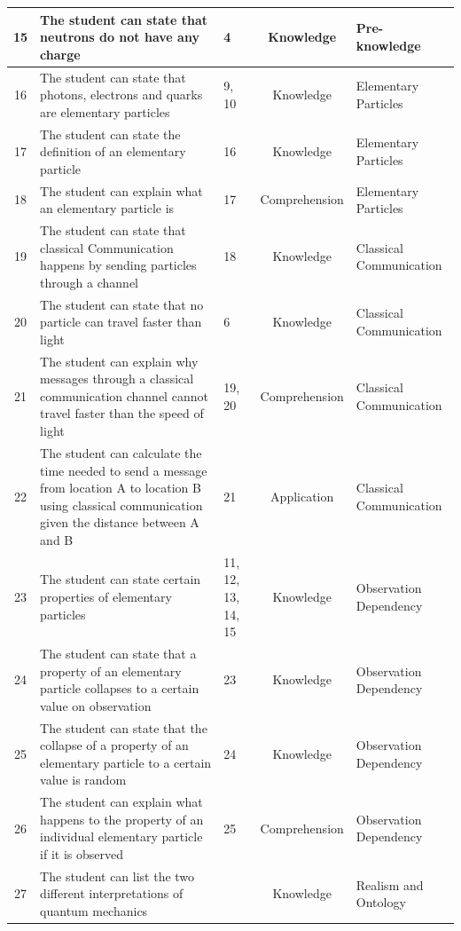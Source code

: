 \documentclass[11pt,twoside]{report} %
\begin{document}
\begin{table}[htbp]
\small
\begin{center}
\begin{tabular}{|c|p{5cm}|p{1.5cm}|c|p{3cm}|}
\hline
15 & The student can state that neutrons do not have any charge & 4 & Knowledge & Pre-knowledge \\ \hline
16 & The student can state that photons, electrons and quarks are elementary particles & 9, 10 & Knowledge & Elementary Particles \\ \hline
17 & The student can state the definition of an elementary particle & 16 & Knowledge & Elementary Particles \\ \hline
18 & The student can explain what an elementary particle is & 17 & Comprehension & Elementary Particles \\ \hline
19 & The student can state that classical Communication happens by sending particles through a channel & 18 & Knowledge & Classical Communication \\ \hline
20 & The student can state that no particle can travel faster than light & 6 & Knowledge & Classical Communication \\ \hline
21 & The student can explain why messages through a classical communication channel cannot travel faster than the speed of light & 19, 20 & Comprehension & Classical Communication \\ \hline
22 & The student can calculate the time needed to send a message from location A to location B using classical communication given the distance between A and B & 21 & Application & Classical Communication \\ \hline
23 & The student can state certain properties of elementary particles & 11, 12, 13, 14, 15 & Knowledge & Observation Dependency \\ \hline
24 & The student can state that a property of an elementary particle collapses to a certain value on observation & 23 & Knowledge & Observation Dependency \\ \hline
25 & The student can state that the collapse of a property of an elementary particle to a certain value is random & 24 & Knowledge & Observation Dependency \\ \hline
26 & The student can explain what happens to the property of an individual elementary particle if it is observed & 25 & Comprehension & Observation Dependency \\ \hline
27 & The student can list the two different interpretations of quantum mechanics &  & Knowledge & Realism and Ontology \\ \hline

\end{tabular}
\end{center}
\end{table}
\end{document}
